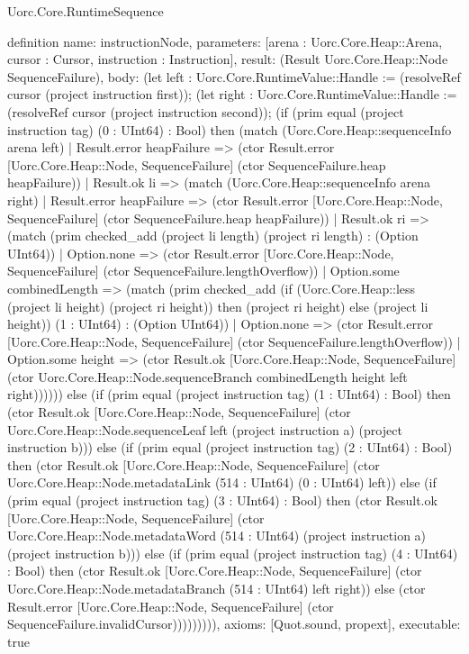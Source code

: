 \begin{lexlean}{Uorc.Core.RuntimeSequence}
\begin{semanticmodule}
definition{
  name: instructionNode,
  parameters: [arena : Uorc.Core.Heap::Arena, cursor : Cursor, instruction : Instruction],
  result: (Result Uorc.Core.Heap::Node SequenceFailure),
  body: (let left : Uorc.Core.RuntimeValue::Handle := (resolveRef cursor (project instruction first)); (let right : Uorc.Core.RuntimeValue::Handle := (resolveRef cursor (project instruction second)); (if (prim equal (project instruction tag) (0 : UInt64) : Bool) then (match (Uorc.Core.Heap::sequenceInfo arena left)
    | Result.error heapFailure => (ctor Result.error [Uorc.Core.Heap::Node, SequenceFailure] (ctor SequenceFailure.heap heapFailure))
    | Result.ok li => (match (Uorc.Core.Heap::sequenceInfo arena right)
      | Result.error heapFailure => (ctor Result.error [Uorc.Core.Heap::Node, SequenceFailure] (ctor SequenceFailure.heap heapFailure))
      | Result.ok ri => (match (prim checked_add (project li length) (project ri length) : (Option UInt64))
        | Option.none => (ctor Result.error [Uorc.Core.Heap::Node, SequenceFailure] (ctor SequenceFailure.lengthOverflow))
        | Option.some combinedLength => (match (prim checked_add (if (Uorc.Core.Heap::less (project li height) (project ri height)) then (project ri height) else (project li height)) (1 : UInt64) : (Option UInt64))
          | Option.none => (ctor Result.error [Uorc.Core.Heap::Node, SequenceFailure] (ctor SequenceFailure.lengthOverflow))
          | Option.some height => (ctor Result.ok [Uorc.Core.Heap::Node, SequenceFailure] (ctor Uorc.Core.Heap::Node.sequenceBranch combinedLength height left right)))))) else (if (prim equal (project instruction tag) (1 : UInt64) : Bool) then (ctor Result.ok [Uorc.Core.Heap::Node, SequenceFailure] (ctor Uorc.Core.Heap::Node.sequenceLeaf left (project instruction a) (project instruction b))) else (if (prim equal (project instruction tag) (2 : UInt64) : Bool) then (ctor Result.ok [Uorc.Core.Heap::Node, SequenceFailure] (ctor Uorc.Core.Heap::Node.metadataLink (514 : UInt64) (0 : UInt64) left)) else (if (prim equal (project instruction tag) (3 : UInt64) : Bool) then (ctor Result.ok [Uorc.Core.Heap::Node, SequenceFailure] (ctor Uorc.Core.Heap::Node.metadataWord (514 : UInt64) (project instruction a) (project instruction b))) else (if (prim equal (project instruction tag) (4 : UInt64) : Bool) then (ctor Result.ok [Uorc.Core.Heap::Node, SequenceFailure] (ctor Uorc.Core.Heap::Node.metadataBranch (514 : UInt64) left right)) else (ctor Result.error [Uorc.Core.Heap::Node, SequenceFailure] (ctor SequenceFailure.invalidCursor))))))))),
  axioms: [Quot.sound, propext],
  executable: true
}


\end{semanticmodule}
\end{lexlean}
